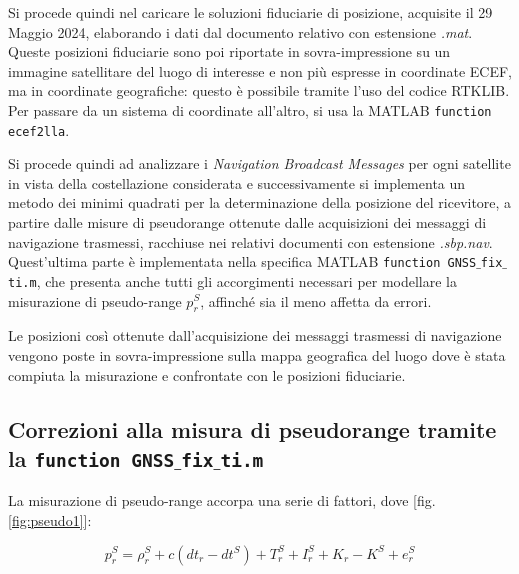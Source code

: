 \documentclass[a4paper,11pt,twoside]{book}
\begin{document}
	Si procede quindi nel caricare le soluzioni fiduciarie di posizione, acquisite il 29 Maggio 2024, elaborando i dati dal documento relativo con estensione \textsl{.mat}. Queste posizioni fiduciarie sono poi riportate in sovra-impressione su un immagine satellitare del luogo di interesse e non più espresse in coordinate ECEF, ma in coordinate geografiche: questo è possibile tramite l'uso del codice RTKLIB. Per passare da un sistema di coordinate all'altro, si usa la MATLAB \texttt{function ecef2lla}. %
	
	
	Si procede quindi ad analizzare i \textit{Navigation Broadcast Messages} per ogni satellite in vista della costellazione considerata e successivamente si implementa un metodo dei minimi quadrati per la determinazione della posizione del ricevitore, a partire dalle misure di pseudorange ottenute dalle acquisizioni dei messaggi di navigazione trasmessi, racchiuse nei relativi documenti con estensione \textsl{.sbp.nav}. Quest'ultima parte è implementata nella specifica MATLAB \texttt{function GNSS$\_$fix$\_$ti.m}, che presenta anche tutti gli accorgimenti necessari per modellare la misurazione di pseudo-range $p^S_r$, affinché sia il meno affetta da errori.
	
	Le posizioni così ottenute dall'acquisizione dei messaggi trasmessi di navigazione vengono poste in sovra-impressione sulla mappa geografica del luogo dove è stata compiuta la misurazione e confrontate con le posizioni fiduciarie.
	
	\subsection{Correzioni alla misura di pseudorange tramite la \texttt{function GNSS$\_$fix$\_$ti.m}}
	
	La misurazione di pseudo-range accorpa una serie di fattori, dove [fig. \ref{fig:pseudo1}]:
	
	\begin{equation}
		p^S_r = \rho^S_r + c (dt_r - dt^S) + T^S_r + I^S_r + K_r - K^S + e^S_r
	\end{equation}
	
\end{document}
